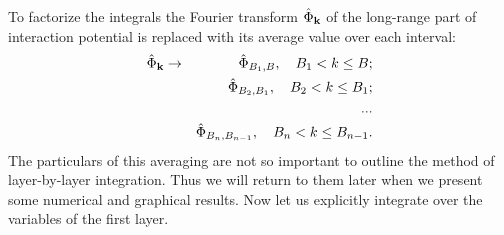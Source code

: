 To factorize the integrals the Fourier transform $\hat{\Phi}_{\vb k}$ of the long-range part of interaction potential is replaced with its average value over each interval:
\begin{eqnarray*}
	\hat{\Phi}_{\vb k} & \rightarrow & \hat{\Phi}_{B_1, B}, \quad B_1 < k \leq B;
	\\
	& & \hat{\Phi}_{B_2, B_1}, \quad B_2 < k \leq B_1;
	\\
	& & ...
	\\
	& & \hat{\Phi}_{B_n, B_{n-1}}, \quad B_n < k \leq B_{n-1}.
\end{eqnarray*}
The particulars of this averaging are not so important to outline the method of layer-by-layer integration. Thus we will return to them later when we present some numerical and graphical results.
Now let us explicitly integrate over the variables of the first layer.